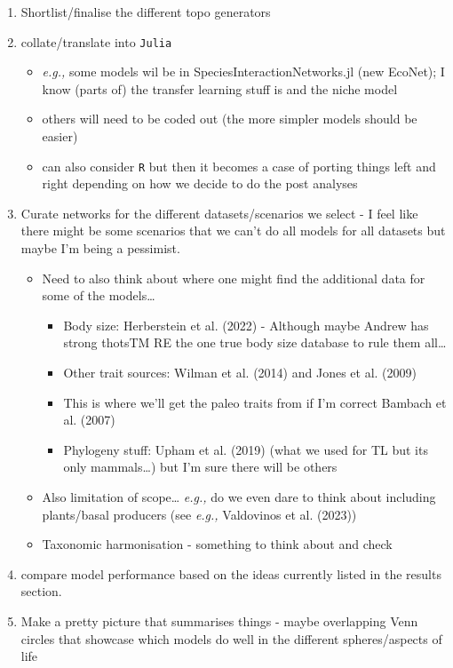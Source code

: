 \documentclass[
]{agujournal2019}
\providecommand{\tightlist}{%
  \setlength{\itemsep}{0pt}\setlength{\parskip}{0pt}}\usepackage{longtable,booktabs,array}
\begin{document}
\begin{enumerate}
\def\labelenumi{\arabic{enumi}.}
\tightlist
\item
  Shortlist/finalise the different topo generators
\item
  collate/translate into \texttt{Julia}

  \begin{itemize}
  \tightlist
  \item
    \emph{e.g.,} some models wil be in SpeciesInteractionNetworks.jl
    (new EcoNet); I know (parts of) the transfer learning stuff is and
    the niche model
  \item
    others will need to be coded out (the more simpler models should be
    easier)
  \item
    can also consider \texttt{R} but then it becomes a case of porting
    things left and right depending on how we decide to do the post
    analyses
  \end{itemize}
\item
  Curate networks for the different datasets/scenarios we select - I
  feel like there might be some scenarios that we can't do all models
  for all datasets but maybe I'm being a pessimist.

  \begin{itemize}
  \tightlist
  \item
    Need to also think about where one might find the additional data
    for some of the models\ldots{}

    \begin{itemize}
    \tightlist
    \item
      Body size: Herberstein et al. (2022) - Although maybe Andrew has
      strong thotsTM RE the one true body size database to rule them
      all\ldots{}
    \item
      Other trait sources: Wilman et al. (2014) and Jones et al. (2009)
    \item
      This is where we'll get the paleo traits from if I'm correct
      Bambach et al. (2007)
    \item
      Phylogeny stuff: Upham et al. (2019) (what we used for TL but its
      only mammals\ldots) but I'm sure there will be others
    \end{itemize}
  \item
    Also limitation of scope\ldots{} \emph{e.g.,} do we even dare to
    think about including plants/basal producers (see \emph{e.g.,}
    Valdovinos et al. (2023))
  \item
    Taxonomic harmonisation - something to think about and check
  \end{itemize}
\item
  compare model performance based on the ideas currently listed in the
  results section.
\item
  Make a pretty picture that summarises things - maybe overlapping Venn
  circles that showcase which models do well in the different
  spheres/aspects of life
\end{enumerate}
\end{document}
